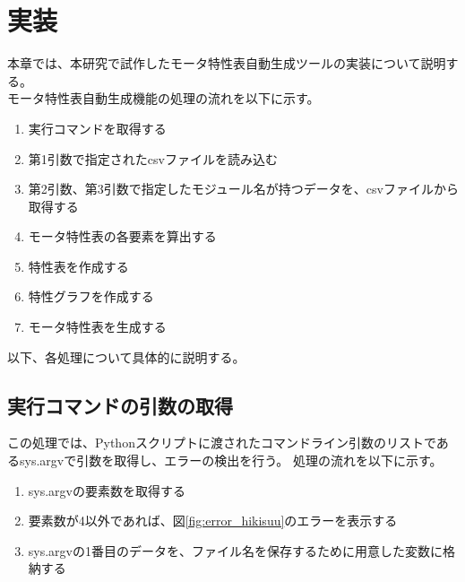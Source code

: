 \chapter{実装}\label{cha:Implementation}
本章では、本研究で試作したモータ特性表自動生成ツールの実装について説明する。\\
モータ特性表自動生成機能の処理の流れを以下に示す。
\begin{enumerate}
    \item 実行コマンドを取得する
    \item 第1引数で指定されたcsvファイルを読み込む
    \item 第2引数、第3引数で指定したモジュール名が持つデータを、csvファイルから取得する
    \item モータ特性表の各要素を算出する
    \item 特性表を作成する
    \item 特性グラフを作成する
    \item モータ特性表を生成する
\end{enumerate}

以下、各処理について具体的に説明する。

\section{実行コマンドの引数の取得}\label{comandget}
この処理では、Pythonスクリプトに渡されたコマンドライン引数のリストであるsys.argvで引数を取得し、エラーの検出を行う。
処理の流れを以下に示す。
\begin{enumerate}
    \item sys.argvの要素数を取得する
    \item 要素数が4以外であれば、図\ref{fig:error_hikisuu}のエラーを表示する
    \item sys.argvの1番目のデータを、ファイル名を保存するために用意した変数に格納する
\end{enumerate}


